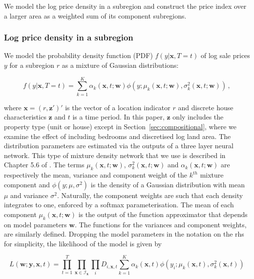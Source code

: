 We model the log price density in a subregion and construct the price index over a larger area as a weighted sum of its component subregions. 

\subsubsection{Log price density in a subregion}

We model the probability density function (PDF) $f(y \vert \mathbf{x}, T = t)$ of log sale prices $y$ for a subregion $r$ as a mixture of Gaussian distributions:

\begin{equation} \label{eq:mixture}
	f(y \vert \mathbf{x}, T = t) = \sum_{k=1}^{K} \alpha_k (\mathbf{x}, t;\mathbf{w}) \phi(y;\mu_k(\mathbf{x}, t;\mathbf{w}),\sigma^2_k(\mathbf{x}, t;\mathbf{w}))  \,,
\end{equation}

where $\mathbf{x} = (r, \mathbf{z}')'$ is the vector of a location indicator $r$ and discrete house characteristics $\mathbf{z}$ and $t$ is a time period. In this paper, $\mathbf{z}$ only includes the property type (unit or house) except in Section~\ref{sec:compositional}, where we examine the effect of including bedrooms and discretised log land area. 
The distribution parameters are estimated via the outputs of a three layer neural network. This type of mixture density network that we use is described in Chapter 5.6 of \cite{bishop2006}.
 The terms $\mu_k (\mathbf{x}, t;\mathbf{w})$, $\sigma^2_k (\mathbf{x}, t;\mathbf{w})$ and $\alpha_k (\mathbf{x}, t;\mathbf{w})$ are respectively the mean, variance and component weight of the $k^{th}$ mixture component and $\phi(y;\mu,\sigma^2)$ is the density of a Gaussian distribution with mean $\mu$ and variance $\sigma^2$. Naturally, the component weights are such that each density integrates to one, enforced by a softmax parameterisation. 
 The mean of each component  $\mu_k (\mathbf{x}, t;\mathbf{w})$ is the output of the function approximator that depends on model parameters $\mathbf{w}$. The functions for the variances and component weights, are similarly defined. Dropping the model parameters in the notation on the rhs for simplicity, the likelihood of the model is given by

\begin{equation} \label{eq:lik}
	L(\mathbf{w};\mathbf{y},\mathbf{x}, t)=\prod_{t=1}^T\prod_{\mathbf{x} \in \mathcal{I}_{\mathbf{x}}}\prod_{i} D_{i, \mathbf{x}, t} \sum_{k=1}^K\alpha_k(\mathbf{x}, t)\phi(y_i;\mu_k(\mathbf{x}, t),\sigma_k^2(\mathbf{x}, t))
\end{equation}

